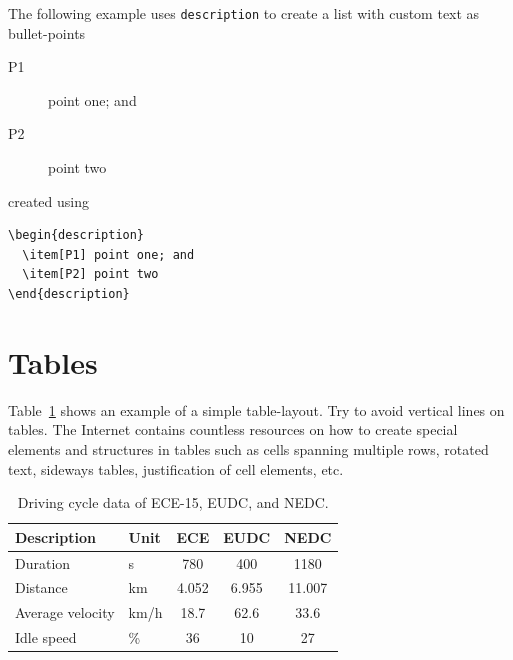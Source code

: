 The following example uses \texttt{description} to create a list with custom text as bullet-points
\begin{description}
  \item[P1] point one; and
  \item[P2] point two
\end{description}
created using
\begin{verbatim}
\begin{description}
  \item[P1] point one; and
  \item[P2] point two
\end{description}
\end{verbatim}


\section{Tables}\label{sec:tables}
Table~\ref{tab:table} shows an example of a simple table-layout. Try to avoid vertical lines on tables. The Internet contains countless resources on how to create special elements and structures in tables such as cells spanning multiple rows, rotated text, sideways tables, justification of cell elements, etc.
\begin{table}[ht]
\begin{center}
\caption{Driving cycle data of ECE-15, EUDC, and NEDC.}\vspace{1ex}
\label{tab:table}
\begin{tabular}{llccc}\hline
Description & Unit & ECE & EUDC & NEDC \\ \hline
Duration & s & 780 & 400 & 1180 \\
Distance & km & 4.052 & 6.955 & 11.007 \\
Average velocity & km/h & 18.7 &  62.6 & 33.6 \\
Idle speed & \% & 36 & 10 & 27 \\ \hline
\end{tabular}
\end{center}
\end{table}


